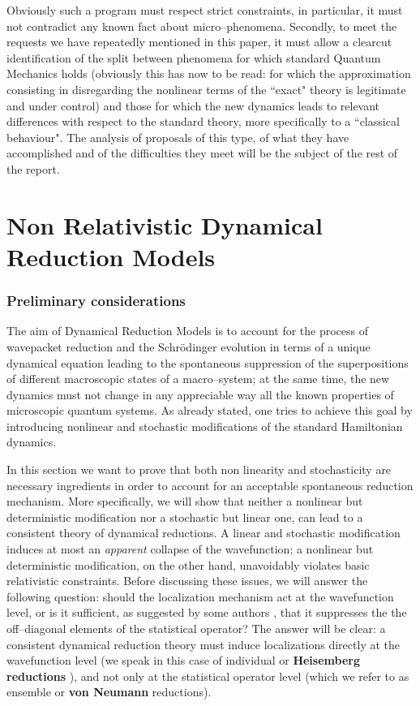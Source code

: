 \documentclass[12pt]{article}
\begin{document}
Obviously such a program must respect strict constraints, in
particular, it must not contradict any known fact about
micro--phenomena. Secondly, to meet the requests we have
repeatedly mentioned in this paper, it must allow a clearcut
identification of the split between phenomena for which standard
Quantum Mechanics holds (obviously this has now to be read: for
which the approximation consisting in disregarding the nonlinear
terms of the ``exact" theory is legitimate and under control) and
those for which the new dynamics leads to relevant differences
with respect to the standard theory, more specifically to a
``classical behaviour". The analysis of proposals of this type, of
what they have accomplished and of the difficulties they meet will
be the subject of the rest of the report.


\newpage

\part{Non Relativistic Dynamical Reduction Models}

\section{Preliminary considerations} \label{sec4}


The aim of Dynamical Reduction Models is to account for the
process of wavepacket reduction and the Schr\"odinger evolution in
terms of a unique dynamical equation leading to the spontaneous
suppression of the superpositions of different macroscopic states
of a macro--system; at the same time, the new dynamics must not
change in any appreciable way all the known properties of
microscopic quantum systems. As already stated, one tries to
achieve this goal by introducing nonlinear and stochastic
modifications of the standard Hamiltonian dynamics.

In this section we want to prove that both non linearity and
stochasticity are necessary ingredients in order to account for an
acceptable spontaneous reduction mechanism. More specifically, we
will show that neither a nonlinear but deterministic modification
nor a stochastic but linear one, can lead to a consistent theory
of dynamical reductions. A linear and stochastic modification
induces at most an {\it apparent} collapse of the wavefunction; a
nonlinear but deterministic modification, on the other hand,
unavoidably violates basic relativistic constraints. Before
discussing these issues, we will answer the following question:
should the localization mechanism act at the wavefunction level,
or is it sufficient, as suggested by some authors
\cite{zur1,zu,lib}, that it suppresses the the off--diagonal
elements of the statistical operator? The answer will be clear: a
consistent dynamical reduction theory must induce localizations
directly at the wavefunction level (we speak in this case of
individual or {\bf Heisemberg reductions} \cite{std}), and not
only at the statistical operator level (which we refer to as
ensemble or {\bf von Neumann} reductions).
\end{document}
